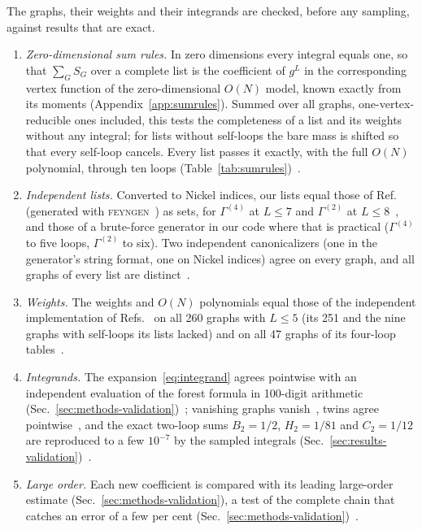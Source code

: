 The graphs, their weights and their integrands are checked, before any sampling, against results that are exact.
\begin{enumerate}
\item \emph{Zero-dimensional sum rules.} In zero dimensions every integral equals one, so that $\sum_{G}S_G$ over a
complete list is the coefficient of $g^L$ in the corresponding vertex function of the zero-dimensional $O(N)$ model,
known exactly from its moments (Appendix~\ref{app:sumrules}). Summed over all graphs, one-vertex-reducible ones
included, this tests the completeness of a list and its weights without any integral; for lists without self-loops the
bare mass is shifted so that every self-loop cancels. Every list passes it exactly, with the full $O(N)$
polynomial, through ten loops (Table~\ref{tab:sumrules})~.
\item \emph{Independent lists.} Converted to Nickel indices, our lists equal those of Ref.~\cite{Phi4tools2024}
(generated with \textsc{feyngen}~\cite{Borinsky2014feyngen}) as sets, for $\Gamma^{(4)}$ at $L\le7$ and $\Gamma^{(2)}$ at
$L\le8$~, and those of a brute-force generator in our code where that is practical ($\Gamma^{(4)}$ to five loops,
$\Gamma^{(2)}$ to six). Two independent canonicalizers (one in the generator's string format, one on Nickel indices)
agree on every graph, and all graphs of every list are distinct~.
\item \emph{Weights.} The weights and $O(N)$ polynomials equal those of the independent implementation of
Refs.~\cite{Ribeca2003thesis,GuidaRibeca2006} on all 260 graphs with $L\le5$ (its 251 and the nine graphs with self-loops its lists lacked) and on all 47
graphs of its four-loop tables~.
\item \emph{Integrands.} The expansion~\eqref{eq:integrand} agrees pointwise with an independent evaluation of the
forest formula in 100-digit arithmetic (Sec.~\ref{sec:methods-validation})~; vanishing graphs
vanish~, twins agree pointwise~, and the exact two-loop sums $B_2=1/2$, $H_2=1/81$ and $C_2=1/12$
are reproduced to a few $10^{-7}$ by the sampled integrals (Sec.~\ref{sec:results-validation})~.
\item \emph{Large order.} Each new coefficient is compared with its leading large-order estimate
(Sec.~\ref{sec:methods-validation}), a test of the complete chain that catches an error of a few per cent (Sec.~\ref{sec:methods-validation})~.
\end{enumerate}
